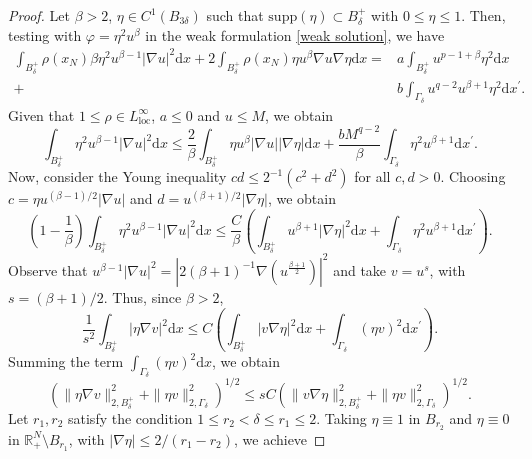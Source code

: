 \documentclass[12pt,reqno]{amsart}
\begin{document}
\begin{proof} Let $\beta>2$, $\eta\in C^1(B_{3\delta})$ such that $\mathrm{supp} (\eta)\subset B_\delta^+$ with $0\leq \eta\leq1$. Then, testing with $\varphi=\eta^2u^\beta$ in the weak formulation \eqref{weak solution}, we have
\begin{align*}
    \int_{B_\delta^+}\rho(x_N)\beta \eta^2u^{\beta-1}|\nabla u|^2\mathrm{d}x+2\int_{B_\delta^+}\rho(x_N)\eta u^\beta \nabla u\nabla \eta\mathrm{d}x=&a\int_{B_\delta^+}u^{p-1+\beta}\eta^2\mathrm{d}x\\
    +&b\int_{\Gamma_\delta}u^{q-2}u^{\beta+1}\eta^2\mathrm{d}x^\prime.
\end{align*}
Given that $1\leq \rho \in L^\infty_\mathrm{loc}$, $a\leq 0$ and $u\leq M$, we obtain
\begin{equation*}
    \int_{B_\delta^+}\eta^2u^{\beta-1}|\nabla u|^2\mathrm{d}x\leq \frac{2}{\beta}\int_{B_\delta^+}\eta u^\beta |\nabla u||\nabla \eta|\mathrm{d}x+\frac{bM^{q-2}}{\beta}\int_{\Gamma_\delta}\eta^2 u^{\beta+1}\mathrm{d}x^\prime.
\end{equation*}
Now, consider the Young inequality $cd\leq 2^{-1}( c^2+ d^2)$ for all $c,d>0$. Choosing $c=\eta u^{(\beta-1)/2}|\nabla u|$ and $d=u^{(\beta+1)/2}|\nabla \eta|$, we obtain
\begin{equation*}
\left(1-\frac{1}{\beta}\right)\int_{B_\delta^+}\eta^2u^{\beta-1}|\nabla u|^2\mathrm{d}x\leq  \frac{C}{\beta}\left(\int_{B_\delta^+}u^{\beta+1}|\nabla \eta|^2\mathrm{d}x+\int_{\Gamma_\delta}\eta^2u^{\beta+1}\mathrm{d}x^\prime\right).
\end{equation*}
Observe that $u^{\beta-1}|\nabla u|^2=|2(\beta+1)^{-1}\nabla (u^{\frac{\beta+1}{2}})|^2$ and take $v=u^s$, with $s=(\beta+1)/2$. Thus, since $\beta>2$,
\begin{equation*}
    \frac{1}{s^2}\int_{B_\delta^+}|\eta \nabla v|^2\mathrm{d}x\leq C\left(\int_{B_\delta^+}|v\nabla\eta|^2\mathrm{d}x+\int_{\Gamma_\delta}(\eta v)^2\mathrm{d}x^\prime\right).
\end{equation*}
Summing the term $\int_{\Gamma_\delta}(\eta v)^2\mathrm{d}x$, we obtain
\begin{equation*}
    \left(\|\eta\nabla v\|_{2,B_\delta^+}^2+\|\eta v\|_{2,\Gamma_\delta}^2\right)^{1/2}\leq sC\left(\|v\nabla \eta\|_{2,B_\delta^+}^2+\|\eta v\|_{2,\Gamma_\delta}^2\right)^{1/2}.
\end{equation*}
Let $r_1,r_2$ satisfy the condition $1\leq r_2<\delta\leq r_1\leq 2$. Taking $\eta \equiv 1$ in $B_{r_2}$ and $\eta \equiv 0$ in $\mathds{R}_{+}^{N}\setminus B_{r_1}$, with $| \nabla \eta |\leq 2/(r_1-r_2)$, we achieve

\end{proof}
\end{document}

